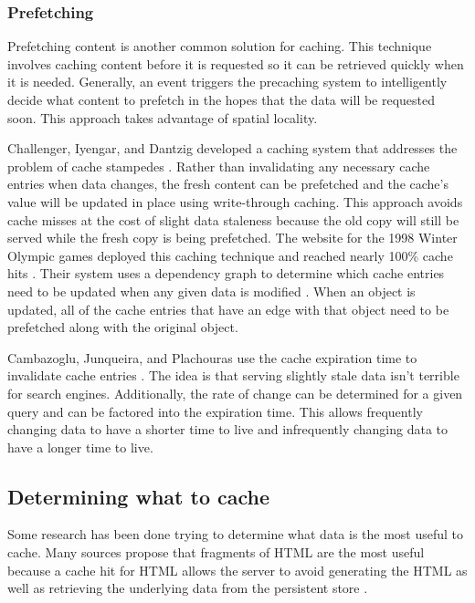 \documentclass[12pt]{ucthesis}
\begin{document}
\subsubsection{Prefetching}
Prefetching content is another common solution for caching.
This technique involves caching content before it is requested so it can be retrieved quickly when it is needed.
Generally, an event triggers the precaching system to intelligently decide what content to prefetch in the hopes that the data will be requested soon.
This approach takes advantage of spatial locality.

Challenger, Iyengar, and Dantzig developed a caching system that addresses the problem of cache stampedes \cite{scalableConsistentCaching}.
Rather than invalidating any necessary cache entries when data changes, the fresh content can be prefetched and the cache's value will be updated in place using write-through caching.
This approach avoids cache misses at the cost of slight data staleness because the old copy will still be served while the fresh copy is being prefetched.
The website for the 1998 Winter Olympic games deployed this caching technique and reached nearly 100\% cache hits \cite{scalableConsistentCaching}.
Their system uses a dependency graph to determine which cache entries need to be updated when any given data is modified \cite{scalableConsistentCaching}.
When an object is updated, all of the cache entries that have an edge with that object need to be prefetched along with the original object.

Cambazoglu, Junqueira, and Plachouras use the cache expiration time to invalidate cache entries \cite{refreshingPerspectiveSearch}.
The idea is that serving slightly stale data isn't terrible for search engines.
Additionally, the rate of change can be determined for a given query and can be factored into the expiration time.
This allows frequently changing data to have a shorter time to live and infrequently changing data to have a longer time to live.

\subsection{Determining what to cache}
Some research has been done trying to determine what data is the most useful to cache.
Many sources propose that fragments of HTML are the most useful because a cache hit for HTML allows the server to avoid generating the HTML as well as retrieving the underlying data from the persistent store \cite{comparisonOfCachingSolutions, scalableConsistentCaching, howBasecampGotSoFast}.
\end{document}
